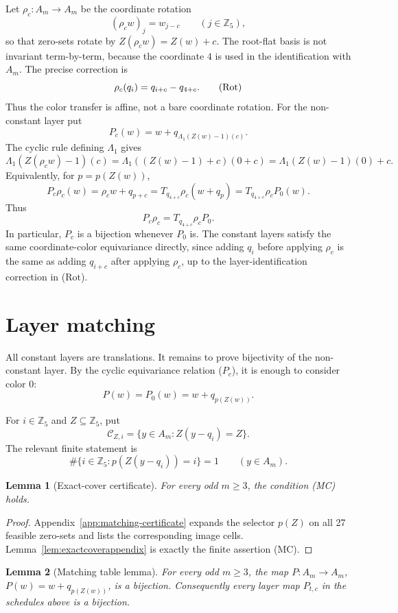 \documentclass[11pt]{article}
\newtheorem{lemma}{Lemma}
\theoremstyle{definition}
\newcommand{\Zfive}{\mathbb Z_5}
\begin{document}
Let \(\rho_c:A_m\to A_m\) be the coordinate rotation
\[
(\rho_c w)_j=w_{j-c}\qquad (j\in\mathbb Z_5),
\]
so that zero-sets rotate by \(Z(\rho_c w)=Z(w)+c\).  The root-flat basis is not invariant term-by-term,
because the coordinate \(4\) is used in the identification with \(A_m\).  The precise correction is
\[
\rho_c(q_i)=q_{i+c}-q_{4+c}. \tag{$\mathrm{Rot}$}
\]
Thus the color transfer is affine, not a bare coordinate rotation.
For the non-constant layer put
\[
P_c(w)=w+q_{\Lambda_1(Z(w)-1)(c)} .
\]
The cyclic rule defining \(\Lambda_1\) gives
\[
\Lambda_1(Z(\rho_c w)-1)(c)=\Lambda_1((Z(w)-1)+c)(0+c)
       =\Lambda_1(Z(w)-1)(0)+c.
\]
Equivalently, for \(p=p(Z(w))\),
\[
P_c\rho_c(w)=\rho_cw+q_{p+c}
      =T_{q_{4+c}}\rho_c(w+q_p)=T_{q_{4+c}}\rho_cP_0(w).
\]
Thus
\[
P_c\rho_c=T_{q_{4+c}}\rho_c P_0. \tag{$P_c$}
\]
In particular, \(P_c\) is a bijection whenever \(P_0\) is.  The constant layers satisfy the same
coordinate-color equivariance directly, since adding \(q_i\) before applying \(\rho_c\) is the same as
adding \(q_{i+c}\) after applying \(\rho_c\), up to the layer-identification correction in
\textup{(\(\mathrm{Rot}\))}.

\section{Layer matching}\label{sec:matching-certificate}

All constant layers are translations.  It remains to prove bijectivity of the non-constant layer.  By
the cyclic equivariance relation \textup{(\(P_c\))}, it is enough to consider color \(0\):
\[
P(w)=P_0(w)=w+q_{p(Z(w))}.
\]

For \(i\in\Zfive\) and \(Z\subseteq\Zfive\), put
\[
\mathcal C_{Z,i}=\{y\in A_m:Z(y-q_i)=Z\}.
\]
The relevant finite statement is
\[
\#\{i\in\Zfive:p(Z(y-q_i))=i\}=1
\qquad(y\in A_m).
\tag{MC}
\]

\begin{lemma}[Exact-cover certificate]\label{lem:exactcover}
For every odd \(m\ge3\), the condition \textup{(MC)} holds.
\end{lemma}

\begin{proof}
Appendix~\ref{app:matching-certificate} expands the selector \(p(Z)\) on all 27 feasible zero-sets
and lists the corresponding image cells.  Lemma~\ref{lem:exactcoverappendix} is exactly the finite
assertion \textup{(MC)}.
\end{proof}

\begin{lemma}[Matching table lemma]\label{lem:matching}
For every odd \(m\ge3\), the map \(P:A_m\to A_m\), \(P(w)=w+q_{p(Z(w))}\), is a bijection.
Consequently every layer map \(P_{t,c}\) in the schedules above is a bijection.
\end{lemma}
\end{document}
